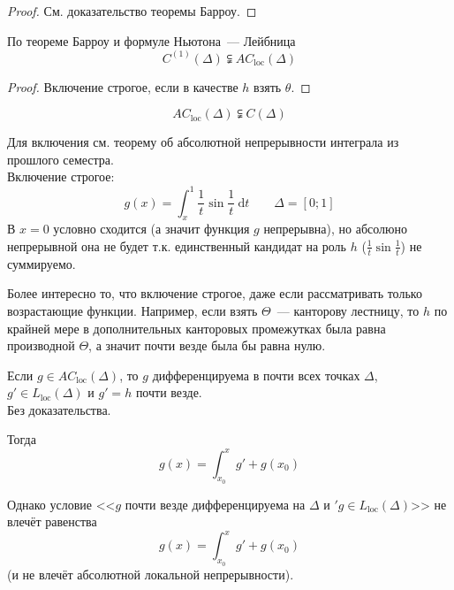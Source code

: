 \documentclass{article}
\begin{document}
    \begin{proof}
        См. доказательство теоремы Барроу.
    \end{proof}
    \begin{property}
        По теореме Барроу и формуле Ньютона~--- Лейбница
        $$
        C^{(1)}(\Delta)\subsetneqq AC_{\mathrm{loc}}(\Delta)
        $$
    \end{property}
    \begin{proof}
        Включение строгое, если в качестве $h$ взять $\theta$.
    \end{proof}
    \begin{property}
        $$
        AC_{\mathrm{loc}}(\Delta)\subsetneqq C(\Delta)
        $$
    \end{property}
    \begin{property}
        Для включения см. теорему об абсолютной непрерывности интеграла из прошлого семестра.\\
        Включение строгое:
        $$
        g(x)=\int_x^1\frac1t\sin\frac1t~\mathrm dt\qquad \Delta=[0;1]
        $$
        В $x=0$ условно сходится (а значит функция $g$ непрерывна), но абсолюно непрерывной она не будет т.к. единственный кандидат на роль $h$ ($\frac1t\sin\frac1t$) не суммируемо.
    \end{property}
    \begin{remark}
        Более интересно то, что включение строгое, даже если рассматривать только возрастающие функции. Например, если взять $\Theta$~--- канторову лестницу, то $h$ по крайней мере в дополнительных канторовых промежутках была равна производной $\Theta$, а значит почти везде была бы равна нулю.
    \end{remark}
    \begin{property}
        Если $g\in AC_{\mathrm{loc}}(\Delta)$, то $g$ дифференцируема в почти всех точках $\Delta$, $g'\in L_{\mathrm{loc}}(\Delta)$ и $g'=h$ почти везде.\\
        Без доказательства.
    \end{property}
    \begin{corollary}
        Тогда
        $$
        g(x)=\int_{x_0}^xg'+g(x_0)
        $$
    \end{corollary}
    \begin{claim}
        Однако условие <<$g$ почти везде дифференцируема на $\Delta$ и $'g\in L_{\mathrm{loc}}(\Delta)$>> не влечёт равенства
        $$
        g(x)=\int_{x_0}^xg'+g(x_0)
        $$
        (и не влечёт абсолютной локальной непрерывности).
    \end{claim}
\end{document}

